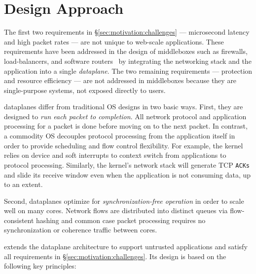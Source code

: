 \section{\ix Design Approach}
\label{sec:design}

The first two requirements in \S\ref{sec:motivation:challenges} ---
microsecond latency and high packet rates --- are not unique to
web-scale applications. These requirements have been addressed in the
design of middleboxes such as firewalls, load-balancers, and software
routers~\cite{routebricks,click} by integrating the networking stack
and the application into a single \emph{dataplane}. The two remaining
requirements --- protection and resource efficiency --- are not
addressed in middleboxes because they are single-purpose systems, not
exposed directly to users.

 dataplanes differ from traditional OS designs in two basic
ways. First, they are designed to \emph{run each packet to
  completion}.  All network protocol and application processing for a
packet is done before moving on to the next packet.    
In contrast, a
commodity OS decouples protocol processing from the application itself
in order to provide scheduling and flow control flexibility.  For
example, the kernel relies on device and soft interrupts to context
switch from applications to protocol processing. Similarly, the
kernel's network stack will generate TCP \texttt{ACKs} and slide its
receive window even when the application is not consuming data, up to
an extent. 

Second,  dataplanes optimize for \emph{synchronization-free
  operation} in order to scale well on many cores. Network flows are
distributed into distinct queues via flow-consistent hashing and common case packet processing requires no
synchronization or coherence traffic between cores.  

\ix extends the dataplane architecture to support untrusted
applications and satisfy all requirements in
\S\ref{sec:motivation:challenges}. Its design is based on the
following key principles:


